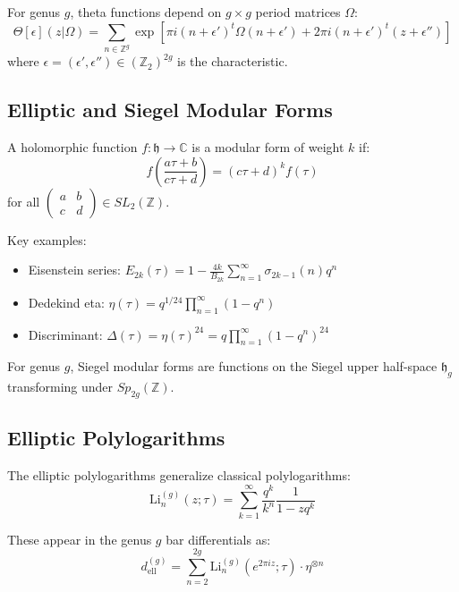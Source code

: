 For genus $g$, theta functions depend on $g \times g$ period matrices $\Omega$:
$$\Theta[\epsilon](z|\Omega) = \sum_{n \in \mathbb{Z}^g} \exp\left[\pi i(n+\epsilon')^t\Omega(n+\epsilon') + 2\pi i(n+\epsilon')^t(z+\epsilon'')\right]$$
where $\epsilon = (\epsilon', \epsilon'') \in (\mathbb{Z}_2)^{2g}$ is the characteristic.

\subsection{Elliptic and Siegel Modular Forms}

\begin{definition}
A holomorphic function $f: \mathfrak{h} \to \mathbb{C}$ is a modular form of weight $k$ if:
$$f\left(\frac{a\tau+b}{c\tau+d}\right) = (c\tau+d)^k f(\tau)$$
for all $\begin{pmatrix} a & b \\ c & d \end{pmatrix} \in SL_2(\mathbb{Z})$.
\end{definition}

Key examples:
\begin{itemize}
\item Eisenstein series: $E_{2k}(\tau) = 1 - \frac{4k}{B_{2k}}\sum_{n=1}^\infty \sigma_{2k-1}(n)q^n$
\item Dedekind eta: $\eta(\tau) = q^{1/24}\prod_{n=1}^\infty(1-q^n)$
\item Discriminant: $\Delta(\tau) = \eta(\tau)^{24} = q\prod_{n=1}^\infty(1-q^n)^{24}$
\end{itemize}

For genus $g$, Siegel modular forms are functions on the Siegel upper half-space $\mathfrak{h}_g$ transforming under $Sp_{2g}(\mathbb{Z})$.

\subsection{Elliptic Polylogarithms}

The elliptic polylogarithms generalize classical polylogarithms:
\[
\text{Li}_n^{(g)}(z;\tau) = \sum_{k=1}^\infty \frac{q^k}{k^n}\frac{1}{1-zq^k}
\]

These appear in the genus $g$ bar differentials as:
\[
d^{(g)}_{\text{ell}} = \sum_{n=2}^{2g} \text{Li}_n^{(g)}(e^{2\pi iz};\tau) \cdot \eta^{\otimes n}
\]
